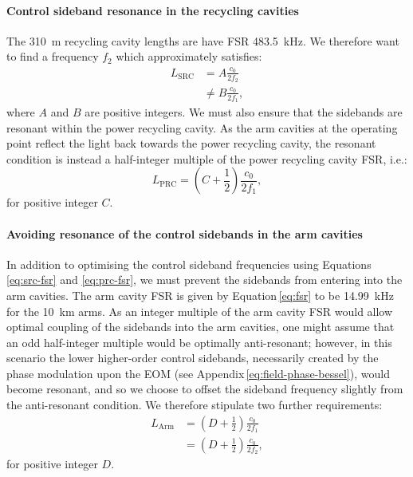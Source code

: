 \paragraph{Control sideband resonance in the recycling cavities}
The \SI{310}{\meter} recycling cavity lengths are have \gls{FSR} \SI{483.5}{\kilo\hertz}. We therefore want to find a frequency $f_2$ which approximately satisfies:
\begin{equation}
  \label{eq:src-fsr}
  \begin{split}
    L_{\text{SRC}} &= A \frac{c_0}{2 f_2} \\
                   &\neq B \frac{c_0}{2 f_1},
  \end{split}
\end{equation}
where $A$ and $B$ are positive integers. We must also ensure that the sidebands are resonant within the power recycling cavity. As the arm cavities at the operating point reflect the light back towards the power recycling cavity, the resonant condition is instead a half-integer multiple of the power recycling cavity \gls{FSR}, i.e.:
\begin{equation}
  \label{eq:prc-fsr}
  L_{\text{PRC}} = \left(C + \frac{1}{2} \right) \frac{c_0}{2 f_1},
\end{equation}
for positive integer $C$.

\paragraph{Avoiding resonance of the control sidebands in the arm cavities}
In addition to optimising the control sideband frequencies using Equations \ref{eq:src-fsr} and \ref{eq:prc-fsr}, we must prevent the sidebands from entering into the arm cavities. The arm cavity \gls{FSR} is given by Equation\,\ref{eq:fsr} to be \SI{14.99}{\kilo\hertz} for the \SI{10}{\kilo\meter} arms. As an integer multiple of the arm cavity \gls{FSR} would allow optimal coupling of the sidebands into the arm cavities, one might assume that an odd half-integer multiple would be optimally anti-resonant; however, in this scenario the lower higher-order control sidebands, necessarily created by the phase modulation upon the \gls{EOM} (see Appendix\,\ref{eq:field-phase-bessel}), would become resonant, and so we choose to offset the sideband frequency slightly from the anti-resonant condition. We therefore stipulate two further requirements:
\begin{equation}
  \label{eq:arm-fsr}
  \begin{split}
    L_{\text{Arm}} &= \left(D + \frac{1}{2} \right) \frac{c_0}{2 f_1} \\
                   &= \left(D + \frac{1}{2} \right) \frac{c_0}{2 f_2},
  \end{split}
\end{equation}
for positive integer $D$.

